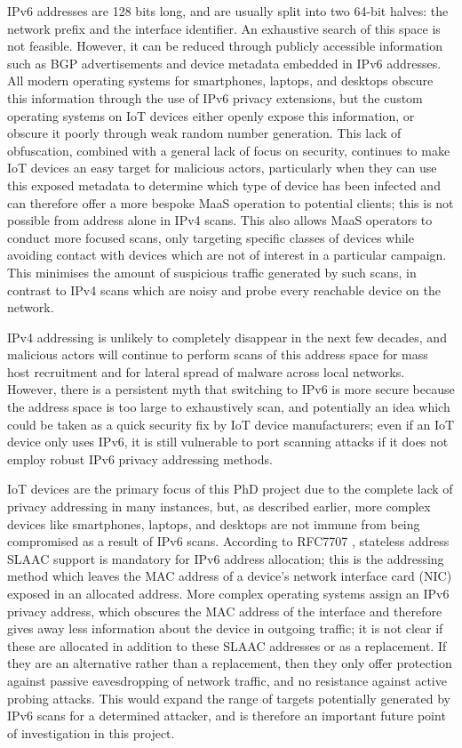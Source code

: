 \documentclass[10pt,sigconf]{acmart}
\begin{document}
IPv6 addresses are 128 bits long, and are usually split into two 64-bit halves: the network prefix and the interface identifier.
An exhaustive search of this space is not feasible.
However, it can be reduced through publicly accessible information such as BGP advertisements and device metadata embedded in IPv6 addresses.
All modern operating systems for smartphones, laptops, and desktops obscure this information through the use of IPv6 privacy extensions, but the custom operating systems on IoT devices either openly expose this information, or obscure it poorly through weak random number generation.
This lack of obfuscation, combined with a general lack of focus on security, continues to make IoT devices an easy target for malicious actors, particularly when they can use this exposed metadata to determine which type of device has been infected and can therefore offer a more bespoke MaaS operation to potential clients;
this is not possible from address alone in IPv4 scans.
This also allows MaaS operators to conduct more focused scans, only targeting specific classes of devices while avoiding contact with devices which are not of interest in a particular campaign.
This minimises the amount of suspicious traffic generated by such scans, in contrast to IPv4 scans which are noisy and probe every reachable device on the network.

IPv4 addressing is unlikely to completely disappear in the next few decades, and malicious actors will continue to perform scans of this address space for mass host recruitment and for lateral spread of malware across local networks.
However, there is a persistent myth that switching to IPv6 is more secure because the address space is too large to exhaustively scan, and potentially an idea which could be taken as a quick security fix by IoT device manufacturers;
even if an IoT device only uses IPv6, it is still vulnerable to port scanning attacks if it does not employ robust IPv6 privacy addressing methods.

IoT devices are the primary focus of this PhD project due to the complete lack of privacy addressing in many instances, but, as described earlier, more complex devices like smartphones, laptops, and desktops are not immune from being compromised as a result of IPv6 scans.
According to RFC7707 \cite{rfc-ipv6-rec}, stateless address SLAAC support is mandatory for IPv6 address allocation;
this is the addressing method which leaves the MAC address of a device's network interface card (NIC) exposed in an allocated address.
More complex operating systems assign an IPv6 privacy address, which obscures the MAC address of the interface and therefore gives away less information about the device in outgoing traffic;
it is not clear if these are allocated in addition to these SLAAC addresses or as a replacement.
If they are an alternative rather than a replacement, then they only offer protection against passive eavesdropping of network traffic, and no resistance against active probing attacks.
This would expand the range of targets potentially generated by IPv6 scans for a determined attacker, and is therefore an important future point of investigation in this project.
\end{document}
